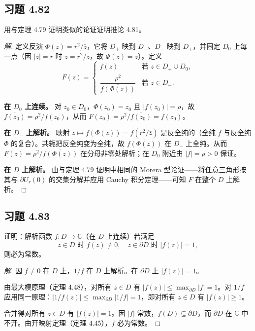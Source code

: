 \documentclass[11pt,a4paper]{article}
\newcommand{\C}{\mathbb{C}}
\theoremstyle{definition}
\newenvironment{solution}{\begin{proof}[解]}{\end{proof}}
\begin{document}
\subsection{习题 4.82}

用与定理 4.79 证明类似的论证证明推论 4.81。

\begin{solution}
  定义反演 $\Phi(z) = r^2/\bar{z}$，它将 $D_+$ 映到 $D_-$、$D_-$ 映到 $D_+$，并固定 $D_0$ 上每一点（因 $|z| = r$ 时 $\bar{z} = r^2/z$，故 $\Phi(z) = z$）。定义
  \[
    F(z) =
    \begin{cases}
      f(z) & \text{若 } z \in D_+ \cup D_0, \\[4pt]
      \dfrac{\rho^2}{\overline{f(\Phi(z))}} & \text{若 } z \in D_-.
    \end{cases}
  \]

  \textbf{在 $D_0$ 上连续。}
  对 $z_0 \in D_0$，$\Phi(z_0) = z_0$ 且 $|f(z_0)| = \rho$，故 $\overline{f(z_0)} = \rho^2/f(z_0)$，从而 $F(z_0) = \rho^2/\overline{f(z_0)} = f(z_0)$。

  \textbf{在 $D_-$ 上解析。}
  映射 $z \mapsto f(\Phi(z)) = f(r^2/\bar{z})$ 是反全纯的（全纯 $f$ 与反全纯 $\Phi$ 的复合）。共轭把反全纯变为全纯，故 $\overline{f(\Phi(z))}$ 在 $D_-$ 上全纯。从而 $F(z) = \rho^2/\overline{f(\Phi(z))}$ 在分母非零处解析；在 $D_0$ 附近由 $|f| = \rho > 0$ 保证。

  \textbf{在 $D$ 上解析。}
  由与定理 4.79 证明中相同的 Morera 型论证——将任意三角形按其与 $\partial U_r(0)$ 的交集分解并应用 Cauchy 积分定理——可知 $F$ 在整个 $D$ 上解析。
\end{solution}

\subsection{习题 4.83}

证明：解析函数 $f : D \to \C$（在 $\overline{D}$ 上连续）若满足
\[
  z \in D \text{ 时 } f(z) \ne 0, \quad
  z \in \partial D \text{ 时 } |f(z)| = 1,
\]
则必为常数。

\begin{solution}
  因 $f \ne 0$ 在 $D$ 上，$1/f$ 在 $D$ 上解析。在 $\partial D$ 上 $|f(z)| = 1$。

  由最大模原理（定理 4.48），对所有 $z \in D$ 有 $|f(z)| \le \max_{\partial D}|f| = 1$。对 $1/f$ 应用同一原理：$|1/f(z)| \le \max_{\partial D}|1/f| = 1$，即对所有 $z \in D$ 有 $|f(z)| \ge 1$。

  合并得对所有 $z \in D$ 有 $|f(z)| = 1$。因 $|f|$ 常数，$f(D) \subseteq \partial D$，而 $\partial D$ 在 $\C$ 中不开。由开映射定理（定理 4.45），$f$ 必为常数。
\end{solution}
\end{document}
